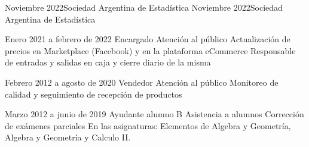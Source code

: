 \documentclass{CV_template}
\begin{document}
\begin{paracol}{2}
\begin{rightcolumn}


            {Noviembre 2022}{Sociedad Argentina de Estadística}
            {Noviembre 2022}{Sociedad Argentina de Estadística}



    {Enero 2021 a febrero de 2022}
    {Encargado}
    {Atención al público}
    {
     }
    {Actualización de precios en Marketplace (Facebook) y en la plataforma eCommerce}
    {Responsable de entradas y salidas en caja y cierre diario de la misma}

    {Febrero 2012 a agosto de 2020}
    {Vendedor}
    {Atención al público}
    {Monitoreo de calidad y seguimiento de recepción de productos}
    {}{}

    {Marzo 2012 a junio de 2019}
    {Ayudante alumno B}
    {Asistencia a alumnos}
    {Corrección de exámenes parciales}
    {En las asignaturas: Elementos de Algebra y Geometría, Algebra y Geometría y Calculo II.}
    {}


\end{rightcolumn}

\end{paracol}
\end{document}
